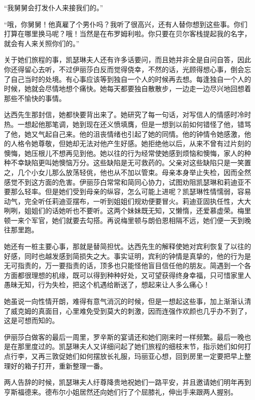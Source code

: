 \par “我舅舅会打发仆人来接我们的。”
\par “哦，你舅舅！他真雇了个男仆吗？我听了很高兴，还有人替你想到这些事。你们打算在哪里换马呢？哦！当然是在布罗姆利啦。你只要在贝尔客栈提起我的名字，就会有人来关照你们的。”
\par 关于她们旅程的事，凯瑟琳夫人还有许多话要问，而且她并非全是自问自答，因此你还得留心去听，不过伊丽莎白反而觉得侥幸，不然的话，光顾得想心事，倒会忘了自己当时的处境。有心事应该等到独自一个人的时候再去想。每逢独自一个人的时候，她就会尽情地想个痛快。她每天都要独自散散步，一边走一边尽兴地回想着那些不愉快的事情。
\par 达西先生那封信，她都快要背出来了。她研究了每一句话，对写信人的情感时冷时热。一想起他那笔调，她到现在还义愤填膺，但是一想到以前如何错怪了他，错骂了他，她又气起自己来。他的沮丧情绪也引起了她的同情。他的钟情令她感激，他的人格令她尊敬，但她却无法对他产生好感。她拒绝他以后，从来不曾有过片刻的懊悔，她压根儿不想再见到他。她以往的行为经常使她感到烦恼和懊悔，家人的种种不幸缺陷更叫她懊恼万分。这些缺陷是无可救药的。父亲对这些缺陷只是一笑置之，几个小女儿那么放荡轻佻，他也从不加以管束。母亲本身举止失检，因而全然感觉不到这方面的危害。伊丽莎白常常和简同心协力，试图劝阻凯瑟琳和莉迪亚不要那么轻率。但是她们受到母亲的纵容，怎么可能上进呢？凯瑟琳性情懦弱，容易动气，完全听任莉迪亚摆布，一听到姐姐们规劝便要冒火。莉迪亚固执任性，大大咧咧，姐姐们的话她听也不要听。这两个妹妹既无知，又懒惰，还爱慕虚荣。梅里顿一来个军官，她们就要去勾搭。再说梅里顿与朗伯恩相隔不远，她们便一天到晚往那里跑。
\par 她还有一桩主要心事，那就是替简担忧。达西先生的解释使她对宾利恢复了以往的好感，同时也越发感到简损失之大。事实证明，宾利的钟情是真挚的，他的行为是无可指责的，万一要指责的话，顶多也只能怪他盲目信任他的朋友。简遇到一个各方面都很理想的机缘，既可以得到种种好处，又可望获得终身幸福，只可惜家里人愚昧无知，行为失检，把这个机遇给断送了，想起来让人多么痛心！
\par 她虽说一向性情开朗，难得有意气消沉的时候，但是一想起这些事，加上渐渐认清了威克姆的真面目，心里难免受到莫大的刺激，因而连强作欢颜也几乎办不到了，这是可想而知的。
\par 伊丽莎白做客的最后一周里，罗辛斯的宴请还和她们刚来时一样频繁。最后一晚也是在那里度过的。凯瑟琳夫人又详细问起了她们旅程的细枝末节，指示她们如何打点行李，又再三敦促她们如何摆放长礼服，玛丽亚心想，回到房里一定要把早上整理好的箱子打开，重新整理一番。
\par 两人告辞的时候，凯瑟琳夫人纡尊降贵地祝她们一路平安，并且邀请她们明年再到亨斯福德来。德布尔小姐居然还向她们行了个屈膝礼，伸出手来跟两人握别。



